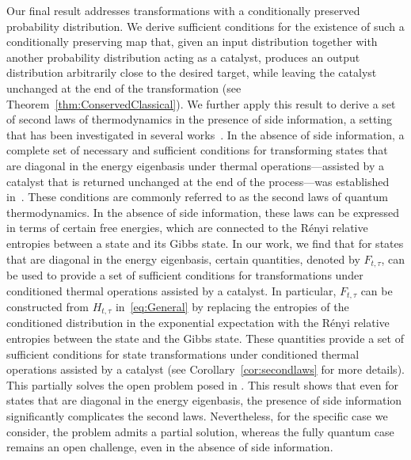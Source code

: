 \documentclass[aps,pra,11pt,onecolumn,nofootinbib,tightenlines]{revtex4-2}
\theoremstyle{definition}
\begin{document}
Our final result addresses transformations with a conditionally preserved probability distribution. We derive sufficient conditions for the existence of such a conditionally preserving map that, given an input distribution together with another probability distribution acting as a catalyst, produces an output distribution arbitrarily close to the desired target, while leaving the catalyst unchanged at the end of the transformation (see Theorem~\ref{thm:ConservedClassical}).
We further apply this result to derive a set of second laws of thermodynamics in the presence of side information, a setting that has been investigated in several works~\cite{sagawa2008second,morris2019assisted,rio2011thermodynamic,bera2017generalized,ji2025fundamental,narasimhachar2017resource}.
In the absence of side information, a complete set of necessary and sufficient conditions for transforming states that are diagonal in the energy eigenbasis under thermal operations—assisted by a catalyst that is returned unchanged at the end of the process—was established in~\cite{Brandao}.
 These conditions are commonly referred to as the second laws of quantum thermodynamics. In the absence of side information, these laws can be expressed in terms of certain free energies, which are connected to the Rényi relative entropies between a state and its Gibbs state. 
 In our work, we find that for states that are diagonal in the energy eigenbasis, certain quantities, denoted by $F_{t,\tau}$,  can be used to provide a set of sufficient conditions for transformations under conditioned thermal operations assisted by a catalyst. In particular, 
 \(F_{t,\tau}\) can be constructed from \(H_{t,\tau}\) in~\eqref{eq:General} by replacing the entropies of the conditioned distribution in the exponential expectation with the R\'enyi relative entropies between the state and the Gibbs state. These quantities provide a set of sufficient conditions for state transformations under conditioned thermal operations assisted by a catalyst (see Corollary~\ref{cor:secondlaws} for more details).
This partially solves the open problem posed in \cite[Section V.B]{ji2025fundamental}.
This result shows that even for states that are diagonal in the energy eigenbasis, the presence of side information significantly complicates the second laws. Nevertheless, for the specific case we consider, the problem admits a partial solution, whereas the fully quantum case remains an open challenge, even in the absence of side information.
\end{document}
